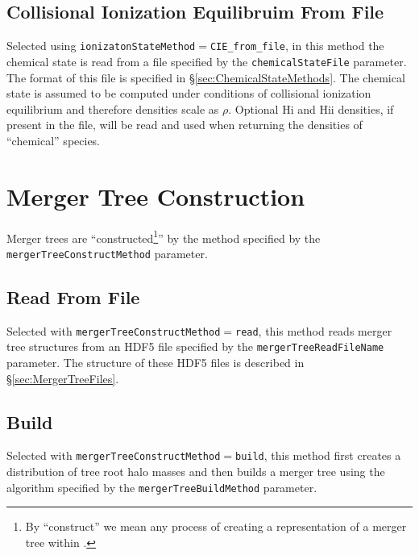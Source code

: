 \subsection{Collisional Ionization Equilibruim From File}

Selected using {\tt ionizatonStateMethod}$=${\tt CIE\_from\_file}, in this method the chemical state is read from a file specified by the {\tt chemicalStateFile} parameter. The format of this file is specified in \S\ref{sec:ChemicalStateMethods}. The chemical state is assumed to be computed under conditions of collisional ionization equilibrium and therefore densities scale as $\rho$. Optional H{\sc i} and H{\sc ii} densities, if present in the file, will be read and used when returning the densities of ``chemical'' species.

\section{Merger Tree Construction}

Merger trees are ``constructed\footnote{By ``construct'' we mean any process of creating a representation of a merger tree within \protect\glc.}'' by the method specified by the {\tt mergerTreeConstructMethod} parameter.

\subsection{Read From File}

Selected with {\tt mergerTreeConstructMethod}$=${\tt read}, this method reads merger tree structures from an HDF5 file specified by the {\tt mergerTreeReadFileName} parameter. The structure of these HDF5 files is described in \S\ref{sec:MergerTreeFiles}.

\subsection{Build}

Selected with {\tt mergerTreeConstructMethod}$=${\tt build}, this method first creates a distribution of tree root halo masses and then builds a merger tree using the algorithm specified by the {\tt mergerTreeBuildMethod} parameter.

